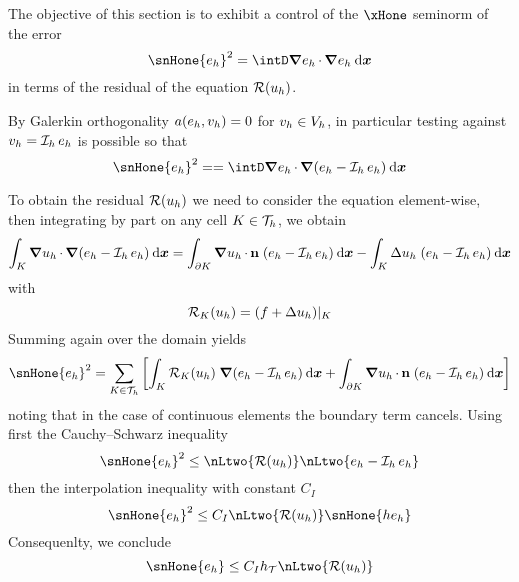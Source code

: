 \medskip
The objective of this section is to exhibit a control of the $\xHone$ seminorm of the error
\begin{equation*}
\snHone{e_h}^2 = \intD \Grad e_h \xDot \Grad e_h \dxx
\end{equation*}
in terms of the residual of the equation ${\mathcal{R}({u_h})}$.

\medskip
By Galerkin orthogonality $a(e_h, {v_h}) = 0$ for ${v_h} \in {{V}}_h$, in particular testing against ${v_h} = \mathop{\mathcal{I}_{h}} e_h$ is possible so that
\begin{equation*}
\snHone{e_h}^2 =  = \intD \Grad e_h \xDot \Grad (e_h - \Iop{h} e_h)\dxx
\end{equation*}

To obtain the residual ${\mathcal{R}({u_h})}$ we need to consider the equation element-wise, then integrating by part on any cell $K \in {\mathcal T}_h$, we obtain
\begin{equation*}
\int_K {\boldsymbol\nabla} {u_h} \,{\mathbf\cdot}\, {\boldsymbol\nabla} (e_h - \mathop{\mathcal{I}_{h}} e_h) \hspace{.5ex}{\mathrm d}{\boldsymbol x} = \int_{\partial K} {\boldsymbol\nabla} {u_h} \,{\mathbf\cdot}\, \mathbf n\;(e_h - \mathop{\mathcal{I}_{h}} e_h) \hspace{.5ex}{\mathrm d}{\boldsymbol x} - \int_K \Delta {u_h} \; (e_h - \mathop{\mathcal{I}_{h}} e_h) \hspace{.5ex}{\mathrm d}{\boldsymbol x}
\end{equation*}
with
\begin{equation*}
{\mathcal{R}_K({u_h})} = (f + \Delta {u_h})\rvert_K
\end{equation*}
Summing again over the domain yields
\begin{equation*}
\snHone{e_h}^2 = \sum _{K\in\meshT}\left[\int_K \ResK{\uh}\; \Grad (e_h - \Iop{h} e_h) \dxx + \int_{\partial K} \Grad \uh \xDot \n\;(e_h - \Iop{h} e_h) \dxx \right]
\end{equation*}
noting that in the case of continuous elements the boundary term cancels.
Using first the Cauchy--Schwarz inequality
\begin{equation*}
\snHone{e_h}^2 \leq \nLtwo{\Res{\uh}} \nLtwo{e_h - \Iop{h} e_h}
\end{equation*}
then the interpolation inequality with constant $C_I$
\begin{equation*}
\snHone{e_h}^2 \leq C_I \nLtwo{\Res{\uh}} \snHone{h e_h}
\end{equation*}
Consequenlty, we conclude
\begin{equation*}
\snHone{e_h} \leq C_I \sizeT \nLtwo{\Res{\uh}}
\end{equation*}


